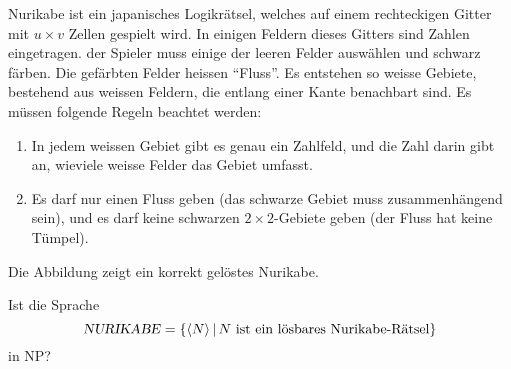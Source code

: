Nurikabe ist ein japanisches Logikrätsel, welches auf einem rechteckigen
Gitter mit $u\times v$ Zellen gespielt wird. In einigen Feldern dieses Gitters
sind Zahlen eingetragen.
der Spieler muss einige der leeren Felder auswählen und schwarz
färben. Die gefärbten Felder heissen ``Fluss''. Es entstehen so
weisse Gebiete, bestehend aus weissen Feldern, die entlang einer Kante
benachbart sind. Es müssen folgende Regeln beachtet werden:
\begin{enumerate}
\item In jedem weissen Gebiet gibt es genau ein Zahlfeld, und die Zahl darin
gibt an, wieviele weisse Felder das Gebiet umfasst.
\item Es darf nur einen Fluss geben (das schwarze Gebiet muss zusammenhängend
sein), und es darf keine schwarzen $2\times 2$-Gebiete geben (der Fluss hat
keine Tümpel).
\end{enumerate}
Die Abbildung zeigt ein korrekt gelöstes Nurikabe.
\begin{center}
\end{center}
Ist die Sprache
\[
\text{\textsl{NURIKABE}}=\{\langle N\rangle\,|\,\text{$N$ ist ein lösbares Nurikabe-Rätsel}\}
\]
in NP?

